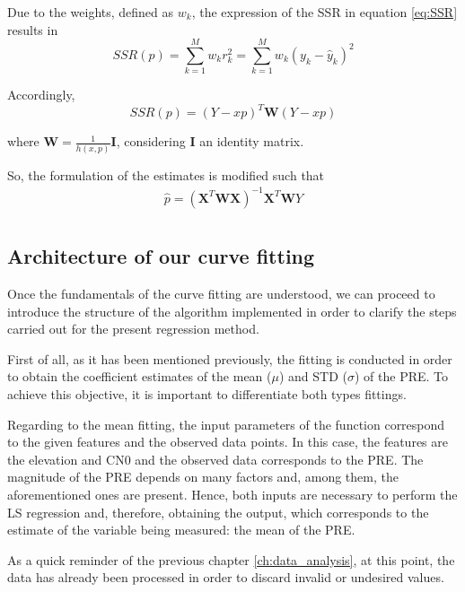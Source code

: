 \documentclass[a4paper, report, oneside, UKenglish]{memoir}
\begin{document}
Due to the weights, defined as $w_{k}$, the expression of the SSR in equation \eqref{eq:SSR} results in
\begin{equation}\label{eq:SSR}
    SSR(p) = \sum\limits_{k=1}^{M}w_{k}{r}_{k}^{2} = \sum\limits_{k=1}^{M}w_{k}(y_k - \hat{y}_k)^2
\end{equation}

Accordingly, 
\begin{equation}
    SSR(p) = (Y - xp)^T\textbf{W}(Y - xp)
\end{equation} 

where $\textbf{W} = \frac{1}{h(x,p)}\textbf{I}$, considering $\textbf{I}$ an identity matrix. 

So, the formulation of the estimates is modified such that
\begin{equation}\label{eq:estimatorWLS}
\begin{split}
    \hat{p} = (\textbf{X}^{T}\textbf{W}\textbf{X})^{-1}\textbf{X}^{T}\textbf{W}Y\\
\end{split}
\end{equation}

\subsection{Architecture of our curve fitting}

Once the fundamentals of the curve fitting are understood, we can proceed to introduce the structure of the algorithm implemented in order to clarify the steps carried out for the present regression method.

First of all, as it has been mentioned previously, the fitting is conducted in order to obtain the coefficient estimates of the mean ($\mu$) and STD ($\sigma$) of the PRE. To achieve this objective, it is important to differentiate both types fittings. 

Regarding to the mean fitting, the input parameters of the function correspond to the given features and the observed data points. In this case, the features are the elevation and CN0 and the observed data corresponds to the PRE. The magnitude of the PRE depends on many factors and, among them, the aforementioned ones are present. Hence, both inputs are necessary to perform the LS regression and, therefore, obtaining the output, which corresponds to the estimate of the variable being measured: the mean of the PRE.  

As a quick reminder of the previous chapter \ref{ch:data_analysis}, at this point, the data has already been processed in order to discard invalid or undesired values. 
\end{document}
